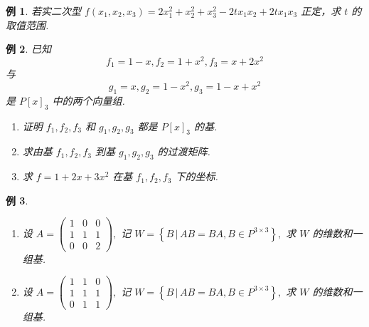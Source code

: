 \documentclass[13pt]{beamer}
\newtheorem{exa}{例}
\begin{document}
\begin{frame}
\begin{exa}
若实二次型 $f\left(x_{1}, x_{2}, x_{3}\right)=2 x_{1}^{2}+x_{2}^{2}+x_{3}^{2}-2 t x_{1} x_{2}+2 t x_{1} x_{3}$ 正定，求 $t$ 的取值范围.
\end{exa}
\end{frame}


\setcounter{exa}{0}
\begin{frame}

\begin{exa}
已知 $$f_{1}=1-x, f_{2}=1+x^{2}, f_{3}=x+2 x^{2}$$ 与 $$g_{1}=x, g_{2}=1-x^{2}, g_{3}=1-x+x^{2}$$ 是 $P[x]_{3}$ 中的两个向量组.
	\begin{enumerate}
		\item 证明 $f_{1}, f_{2}, f_{3}$ 和 $g_{1}, g_{2}, g_{3}$ 都是 $P[x]_{3}$ 的基.
		\item 求由基 $f_{1}, f_{2}, f_{3}$ 到基 $g_{1}, g_{2}, g_{3}$ 的过渡矩阵.
		\item 求 $f=1+2 x+3 x^{2}$ 在基 $f_{1}, f_{2}, f_{3}$ 下的坐标.
	\end{enumerate}
\end{exa}
\end{frame}



\begin{frame}
\small{\begin{exa}
	\begin{enumerate}
		\item 设 $A=\left(\begin{array}{ccc}1 & 0 & 0 \\ 1 & 1 & 1 \\ 0 & 0 & 2\end{array}\right),$ 记 $W=\left\{B\, | \, A B=B A, B \in P^{3 \times 3}\right\},$ 求 $W$ 的维数和一组基.
		\item 设 $A=\left(\begin{array}{ccc}1 & 1 & 0 \\ 1 & 1 & 1 \\ 0 & 1 & 1\end{array}\right),$ 记 $W=\left\{B \, |\, A B=B A, B \in P^{3 \times 3}\right\},$ 求 $W$ 的维数和一组基.
	\end{enumerate}
\end{exa}}
\end{frame}
\end{document}
